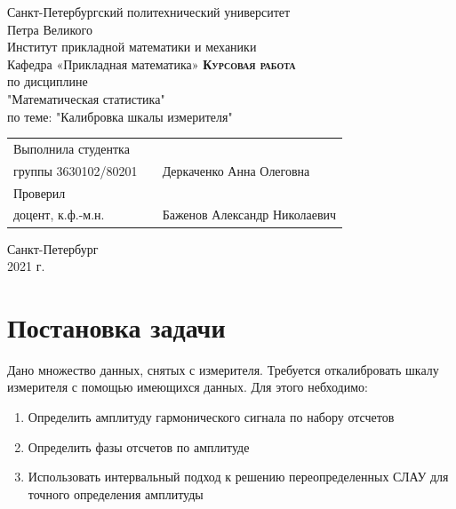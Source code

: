\documentclass[12pt,a4paper]{article}
\begin{document}
    \begin{titlepage}
        \begin{center}
            \large
            Санкт-Петербургский политехнический университет\\Петра Великого\\
            \vspace{0.5cm}
            Институт прикладной математики и механики\\
            \vspace{0.25cm}
            Кафедра «Прикладная математика»
            \vfill
            \textsc{\LARGE\textbf{Курсовая работа}}\\[5mm]
            \Large
            по дисциплине\\"Математическая статистика"\\по теме: "Калибровка шкалы измерителя"
        \end{center}
        \vfill
        \begin{tabular}{l p{} l}
            Выполнила студентка\\группы 3630102/80201 && Деркаченко Анна Олеговна
            \vspace{0.25cm}
            \\Проверил\\доцент, к.ф.-м.н. && Баженов Александр Николаевич
        \end{tabular}
        \vfill
        \begin{center}
            Санкт-Петербург\\2021 г.
        \end{center}
    \end{titlepage}

\newpage
\begin{center}
    \tableofcontents
    \setcounter{page}{2}
\end{center}
\newpage
\begin{center}
    \listoffigures
\end{center}

\newpage
\section{Постановка задачи}
Дано множество данных, снятых с измерителя. Требуется откалибровать шкалу измерителя с помощью имеющихся данных. Для этого небходимо:
\begin{enumerate}
    \item Определить амплитуду гармонического сигнала по набору отсчетов
    \item Определить фазы отсчетов по амплитуде
    \item Использовать интервальный подход к решению переопределенных СЛАУ для точного определения амплитуды
\end{enumerate}
\end{document}
